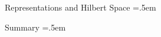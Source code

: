\documentclass[xcolor={dvipsnames}]{beamer}
\let\olditemize=\itemize
\let\endolditemize=\enditemize
\renewenvironment{itemize}{\olditemize \itemsep=.5em }{\endolditemize}
\begin{document}
\begin{frame}{Representations and Hilbert Space}
    \begin{itemize}
        \item<2->
    \end{itemize}    
\end{frame}

\begin{frame}{Summary}
    \begin{itemize}
        \item<2->
    \end{itemize}    
\end{frame}

%     
%     
\end{document}

